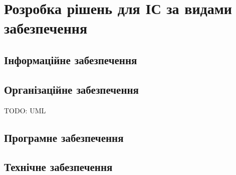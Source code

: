 \chapter{Розробка рішень для ІС за видами забезпечення} 
\label{chap:third}

\section{Інформаційне забезпечення}


\section{Організаційне забезпечення}

TODO: UML 

\section{Програмне забезпечення}

\section{Технічне забезпечення}